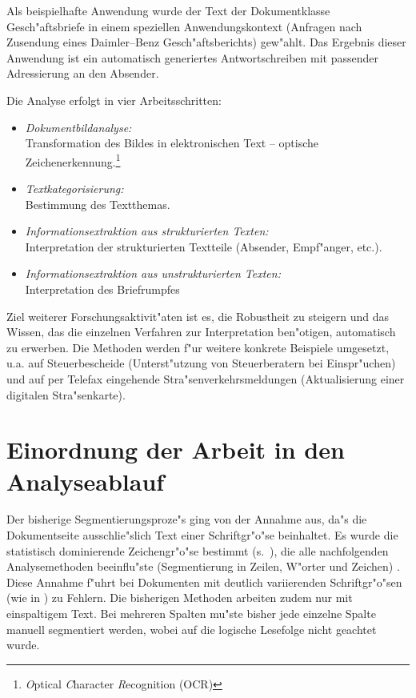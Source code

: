 Als beispielhafte Anwendung wurde der Text der Dokumentklasse
Gesch"aftsbriefe in einem speziellen Anwendungskontext (Anfragen
nach Zusendung eines Daimler--Benz Ge\-sch"afts\-berichts) gew"ahlt. Das
Ergebnis dieser Anwendung ist ein automatisch generiertes
Antwortschreiben mit passender Adressierung an den Absender.

Die Analyse erfolgt in vier Arbeitsschritten:
\begin{itemize}
  
  \item {\sl Dokumentbildanalyse:}\\
    Transformation des Bildes in elektronischen Text --
    optische Zeichenerkennung.\footnote{{\em O\/}ptical {\em C\/}haracter {\em R\/}ecognition (OCR)}

  \item {\sl Textkategorisierung:}\\
    Bestimmung des Textthemas.
  
  \item {\sl Informationsextraktion aus strukturierten Texten:}\\
    Interpretation der strukturierten Textteile (Absender, Empf"anger,
    etc.).

  \item {\sl Informationsextraktion aus unstrukturierten Texten:}\\
    Interpretation des Briefrumpfes

\end{itemize}

Ziel weiterer Forschungsaktivit"aten ist es, die Robustheit zu
steigern und das Wissen, das die einzelnen Verfahren zur Interpretation ben"otigen,
automatisch zu erwerben. Die Methoden werden f"ur weitere 
konkrete Beispiele umgesetzt, u.a. auf Steuerbescheide (Unterst"utzung von Steuerberatern bei
Einspr"uchen) und auf per Telefax eingehende Stra"senverkehrsmeldungen (Aktualisierung einer digitalen Stra"senkarte).

\section{Einordnung der Arbeit in den Analyseablauf}

Der bisherige Segmentierungsproze"s ging von der Annahme aus, da"s die Dokumentseite
ausschlie"slich Text einer Schriftgr"o"se beinhaltet. 
Es wurde die statistisch dominierende Zeichengr"o"se
bestimmt (s.\ ), die 
alle nachfolgenden Analysemethoden beeinflu"ste (Segmentierung in
Zeilen, W"orter und Zeichen) \cite{Bohnacker93}. Diese Annahme f"uhrt bei Dokumenten
mit deutlich variierenden Schriftgr"o"sen (wie in ) zu Fehlern.
Die bisherigen Methoden arbeiten zudem nur mit einspaltigem Text. 
Bei mehreren Spalten mu"ste bisher jede einzelne Spalte manuell segmentiert werden, 
wobei auf die logische Lesefolge nicht geachtet wurde.

